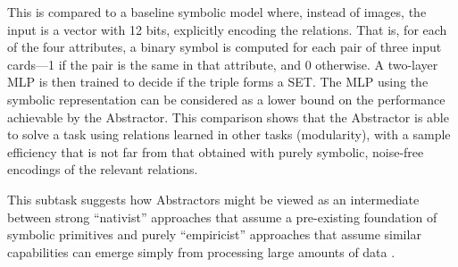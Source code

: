 This is compared to a baseline symbolic model where, instead of images, the input is a vector with 12 bits,
explicitly encoding the relations. That is, for each of the four attributes, a binary symbol is computed for each pair of three input cards---1 if the pair is the same in that attribute, and 0 otherwise. A two-layer MLP is then trained to decide if the triple forms a SET. The MLP using the symbolic representation can be considered as a lower bound on the performance achievable by the Abstractor. This comparison shows that the Abstractor is able to solve a task using relations learned in other tasks (modularity), with a sample efficiency that is not far from that obtained
with purely symbolic, noise-free encodings of the relevant relations. %

This subtask suggests how Abstractors might be viewed as an intermediate between strong ``nativist'' approaches that assume a pre-existing foundation of symbolic primitives and purely ``empiricist'' approaches that assume
similar capabilities can emerge simply from processing large amounts of data \cite{howtogrowamind}.

